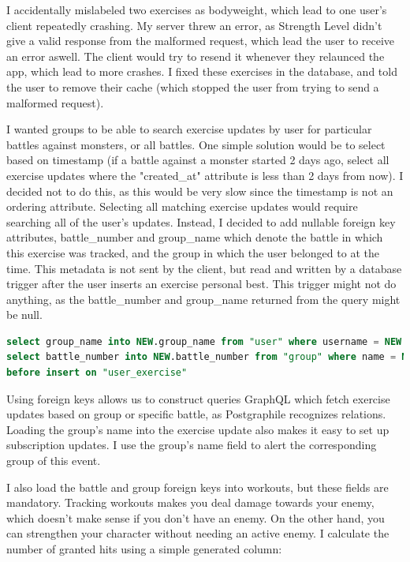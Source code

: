 \documentclass{l4proj}
\begin{document}
I accidentally mislabeled two exercises as bodyweight, which lead to one user's client repeatedly crashing. My server threw an error, as Strength Level didn't give a valid response from the malformed request, which lead the user to receive an error aswell. The client would try to resend it whenever they relaunced the app, which lead to more crashes. I fixed these exercises in the database, and told the user to remove their cache (which stopped the user from trying to send a malformed request).

I wanted groups to be able to search exercise updates by user for particular battles against monsters, or all battles. One simple solution would be to select based on timestamp (if a battle against a monster started 2 days ago, select all exercise updates where the "created\_at" attribute is less than 2 days from now). I decided not to do this, as this would be very slow since the timestamp is not an ordering attribute. Selecting all matching exercise updates would require searching all of the user's updates. Instead, I decided to add nullable foreign key attributes, battle\_number and group\_name which denote the battle in which this exercise was tracked, and the group in which the user belonged to at the time. This metadata is not sent by the client, but read and written by a database trigger after the user inserts an exercise personal best. This trigger might not do anything, as the battle\_number and group\_name returned from the query might be null.

\begin{lstlisting}[language=SQL, caption={This selects the group and battle of the user that created this exercise update}, label=lst:trigger_set_metadata]
select group_name into NEW.group_name from "user" where username = NEW.username;
select battle_number into NEW.battle_number from "group" where name = NEW.group_name;
before insert on "user_exercise"
\end{lstlisting}


Using foreign keys allows us to construct queries GraphQL which fetch exercise updates based on group or specific battle, as Postgraphile recognizes relations. Loading the group's name into the exercise update also makes it easy to set up subscription updates. I use the group's name field to alert the corresponding group of this event.

I also load the battle and group foreign keys into workouts, but these fields are mandatory. Tracking workouts makes you deal damage towards your enemy, which doesn't make sense if you don't have an enemy. On the other hand, you can strengthen your character without needing an active enemy. I calculate the number of granted hits using a simple generated column:
\end{document}
